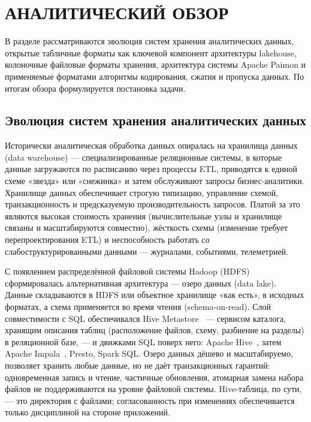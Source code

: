 \section{АНАЛИТИЧЕСКИЙ ОБЗОР}

В разделе рассматриваются эволюция систем хранения аналитических данных, открытые
табличные форматы как ключевой компонент архитектуры lakehouse, колоночные файловые
форматы хранения, архитектура системы Apache Paimon и применяемые форматами
алгоритмы кодирования, сжатия и пропуска данных. По итогам обзора формулируется
постановка задачи.

\subsection{Эволюция систем хранения аналитических данных}

Исторически аналитическая обработка данных опиралась на хранилища данных~\cite{inmon2005datawarehouse, kimball2013toolkit} (data
warehouse) --- специализированные реляционные системы, в которые данные загружаются
по расписанию через процессы ETL, приводятся к единой схеме «звезда» или
«снежинка» и затем обслуживают запросы бизнес-аналитики. Хранилище данных
обеспечивает строгую типизацию, управление схемой, транзакционность и
предсказуемую производительность запросов. Платой за это являются высокая стоимость
хранения (вычислительные узлы и хранилище связаны и масштабируются совместно),
жёсткость схемы (изменение требует перепроектирования ETL) и неспособность работать
со слабоструктурированными данными --- журналами, событиями, телеметрией.

С появлением распределённой файловой системы Hadoop (HDFS) сформировалась
альтернативная архитектура --- озеро данных (data lake). Данные складываются в HDFS
или объектное хранилище «как есть», в исходных форматах, а схема применяется во
время чтения (schema-on-read). Слой совместимости с SQL обеспечивался Hive Metastore~\cite{thusoo2009hive}
--- сервисом каталога, хранящим описания таблиц (расположение файлов, схему,
разбиение на разделы) в реляционной базе, --- и движками SQL поверх него: Apache
Hive~\cite{thusoo2009hive}, затем Apache Impala~\cite{kornacker2015impala}, Presto, Spark SQL. Озеро данных дёшево и масштабируемо,
позволяет хранить любые данные, но не даёт транзакционных гарантий: одновременная
запись и чтение, частичные обновления, атомарная замена набора файлов не
поддерживаются на уровне файловой системы. Hive-таблица, по сути, --- это директория
с файлами; согласованность при изменениях обеспечивается только дисциплиной на
стороне приложений.

